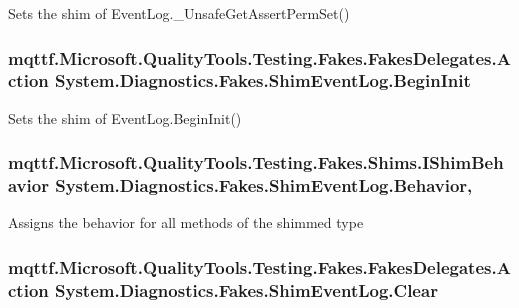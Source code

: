 Sets the shim of Event\-Log.\-\_\-\-Unsafe\-Get\-Assert\-Perm\-Set()

\hypertarget{class_system_1_1_diagnostics_1_1_fakes_1_1_shim_event_log_aa701c8bad9e12a450cb8fe1ff60774c4}{
\subsubsection[{Begin\-Init}]{\setlength{\rightskip}{0pt plus 5cm}mqttf.\-Microsoft.\-Quality\-Tools.\-Testing.\-Fakes.\-Fakes\-Delegates.\-Action System.\-Diagnostics.\-Fakes.\-Shim\-Event\-Log.\-Begin\-Init\hspace{0.3cm}{\ttfamily [set]}}}\label{class_system_1_1_diagnostics_1_1_fakes_1_1_shim_event_log_aa701c8bad9e12a450cb8fe1ff60774c4}


Sets the shim of Event\-Log.\-Begin\-Init()

\hypertarget{class_system_1_1_diagnostics_1_1_fakes_1_1_shim_event_log_a963213ef14a064dd0ee0df890cf8f55f}{
\subsubsection[{Behavior}]{\setlength{\rightskip}{0pt plus 5cm}mqttf.\-Microsoft.\-Quality\-Tools.\-Testing.\-Fakes.\-Shims.\-I\-Shim\-Behavior System.\-Diagnostics.\-Fakes.\-Shim\-Event\-Log.\-Behavior\hspace{0.3cm}{\ttfamily [static]}, {\ttfamily [set]}}}\label{class_system_1_1_diagnostics_1_1_fakes_1_1_shim_event_log_a963213ef14a064dd0ee0df890cf8f55f}


Assigns the behavior for all methods of the shimmed type

\hypertarget{class_system_1_1_diagnostics_1_1_fakes_1_1_shim_event_log_acd3e91cfc0e06cab11e2c92a78f0fddb}{
\subsubsection[{Clear}]{\setlength{\rightskip}{0pt plus 5cm}mqttf.\-Microsoft.\-Quality\-Tools.\-Testing.\-Fakes.\-Fakes\-Delegates.\-Action System.\-Diagnostics.\-Fakes.\-Shim\-Event\-Log.\-Clear\hspace{0.3cm}{\ttfamily [set]}}}\label{class_system_1_1_diagnostics_1_1_fakes_1_1_shim_event_log_acd3e91cfc0e06cab11e2c92a78f0fddb}


